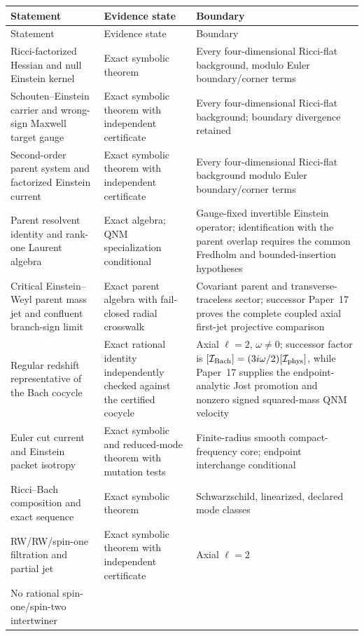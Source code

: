 \documentclass[11pt]{article}
\theoremstyle{definition}
\theoremstyle{remark}
\begin{document}
\small
\begin{longtable}{@{}p{}p{}p{}@{}}
\toprule
Statement & Evidence state & Boundary\\
\midrule
\endfirsthead
\toprule
Statement & Evidence state & Boundary\\
\midrule
\endhead
Ricci-factorized Hessian and null Einstein kernel &
Exact symbolic theorem &
Every four-dimensional Ricci-flat background, modulo Euler boundary/corner terms\\
Schouten--Einstein carrier and wrong-sign Maxwell target gauge &
Exact symbolic theorem with independent certificate &
Every four-dimensional Ricci-flat background; boundary divergence retained\\
Second-order parent system and factorized Einstein current &
Exact symbolic theorem with independent certificate &
Every four-dimensional Ricci-flat background modulo Euler boundary/corner terms\\
Parent resolvent identity and rank-one Laurent algebra &
Exact algebra; QNM specialization conditional &
Gauge-fixed invertible Einstein operator; identification with the parent
overlap requires the common Fredholm and bounded-insertion hypotheses\\
Critical Einstein--Weyl parent mass jet and confluent branch-sign limit &
Exact parent algebra with fail-closed radial crosswalk &
Covariant parent and transverse-traceless sector; successor Paper~17 proves
the complete coupled axial first-jet projective comparison\\
Regular redshift representative of the Bach cocycle &
Exact rational identity independently checked against the certified cocycle &
Axial \(\ell=2\), \(\omega\ne0\); successor factor is
\([\mathcal I_{\rm Bach}]=(3i\omega/2)[\mathcal I_{\rm phys}]\), while
Paper~17 supplies the endpoint-analytic Jost promotion and nonzero
signed squared-mass QNM velocity\\
Euler cut current and Einstein packet isotropy &
Exact symbolic and reduced-mode theorem with mutation tests &
Finite-radius smooth compact-frequency core; endpoint interchange conditional\\
Ricci--Bach composition and exact sequence &
Exact symbolic theorem &
Schwarzschild, linearized, declared mode classes\\
RW/RW/spin-one filtration and partial jet &
Exact symbolic theorem with independent certificate &
Axial \(\ell=2\)\\
No rational spin-one/spin-two intertwiner &

\end{longtable}
\end{document}
